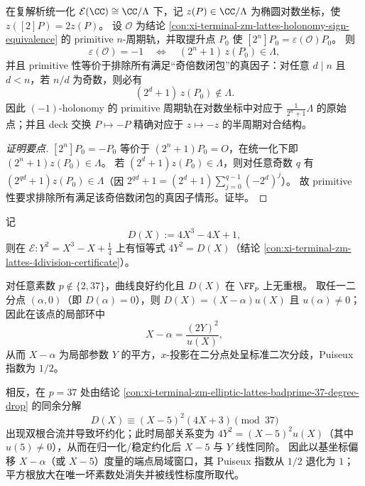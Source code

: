 \begin{conclusion}\label{con:xi-terminal-zm-lattes-elliptic-log-halfperiod-coset}
在复解析统一化 \(\mathcal{E}(\CC)\cong \CC/\Lambda\) 下，记 \(z(P)\in\CC/\Lambda\) 为椭圆对数坐标，使 \(z([2]P)=2z(P)\)。
设 \(\mathcal{O}\) 为结论 \ref{con:xi-terminal-zm-lattes-holonomy-sign-equivalence} 的 primitive \(n\)-周期轨，并取提升点 \(P_0\) 使 \([2^{n}]P_0=\varepsilon(\mathcal{O})P_0\)。
则
\[
\varepsilon(\mathcal{O})=-1
\quad\Longleftrightarrow\quad
(2^{n}+1)\,z(P_0)\in\Lambda,
\]
并且 primitive 性等价于排除所有满足“奇倍数闭包”的真因子：对任意 \(d\mid n\) 且 \(d<n\)，若 \(n/d\) 为奇数，则必有
\[
(2^{d}+1)\,z(P_0)\notin\Lambda.
\]
因此 \((-1)\)-holonomy 的 primitive 周期轨在对数坐标中对应于 \(\frac{1}{2^{n}+1}\Lambda\) 的原始点；并且 deck 交换 \(P\mapsto -P\) 精确对应于 \(z\mapsto -z\) 的半周期对合结构。
\end{conclusion}
\begin{proof}[证明要点]
\([2^{n}]P_0=-P_0\) 等价于 \((2^{n}+1)P_0=O\)，在统一化下即 \((2^{n}+1)z(P_0)\in\Lambda\)。
若 \((2^{d}+1)z(P_0)\in\Lambda\)，则对任意奇数 \(q\) 有 \((2^{qd}+1)z(P_0)\in\Lambda\)（因 \(2^{qd}+1=(2^{d}+1)\sum_{j=0}^{q-1}(-2^d)^j\)）。
故 primitive 性要求排除所有满足该奇倍数闭包的真因子情形。证毕。
\end{proof}

\begin{conclusion}[坏约化处的分歧指数跃迁：二分点平方根统一化在 \(p=37\) 处线性化]\label{con:xi-terminal-zm-bad-reduction-puiseux-exponent-jump}
记
\[
D(X):=4X^{3}-4X+1,
\]
则在 \(\mathcal{E}:Y^{2}=X^{3}-X+\tfrac14\) 上有恒等式 \(4Y^{2}=D(X)\)（结论 \ref{con:xi-terminal-zm-lattes-4division-certificate}）。
\par
对任意素数 \(p\notin\{2,37\}\)，曲线良好约化且 \(D(X)\) 在 \(\FF_p\) 上无重根。
取任一二分点 \((\alpha,0)\)（即 \(D(\alpha)=0\)），则 \(D(X)=(X-\alpha)u(X)\) 且 \(u(\alpha)\neq 0\)；
因此在该点的局部环中
\[
X-\alpha=\frac{(2Y)^{2}}{u(X)},
\]
从而 \(X-\alpha\) 为局部参数 \(Y\) 的平方，\(x\)-投影在二分点处呈标准二次分歧，Puiseux 指数为 \(1/2\)。
\par
相反，在 \(p=37\) 处由结论 \ref{con:xi-terminal-zm-elliptic-lattes-badprime-37-degree-drop} 的同余分解
\[
D(X)\equiv (X-5)^{2}(4X+3)\pmod{37}
\]
出现双根合流并导致坏约化；此时局部关系变为 \(4Y^{2}=(X-5)^{2}u(X)\)（其中 \(u(5)\neq 0\)），从而在归一化/稳定约化后 \(X-5\) 与 \(Y\) 线性同阶。
因此以基坐标偏移 \(X-\alpha\)（或 \(X-5\)）度量的端点局域窗口，其 Puiseux 指数从 \(1/2\) 退化为 \(1\)；
平方根放大在唯一坏素数处消失并被线性标度所取代。
\end{conclusion}

